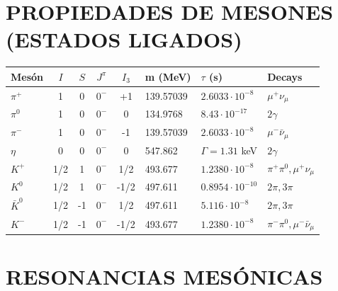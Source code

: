 

\section{PROPIEDADES DE MESONES (ESTADOS LIGADOS)}

{
\centering
\begin{tabular}{|l|c|c|c|c|l|l|l|}
\hline
\textbf{Mesón} & $I$ & $S$ & $J^\pi$ & $I_3$ & \textbf{m (MeV)} & $\tau$ \textbf{(s)} & \textbf{Decays} \\ \hline
$\pi^+$ & 1 & 0 & $0^-$ & +1 & 139.57039 & $2.6033 \cdot 10^{-8}$ & $\mu^+\nu_\mu$ \\ \hline
$\pi^0$ & 1 & 0 & $0^-$ & 0 & 134.9768 & $8.43 \cdot 10^{-17}$ & $2\gamma$ \\ \hline
$\pi^-$ & 1 & 0 & $0^-$ & -1 & 139.57039 & $2.6033 \cdot 10^{-8}$ & $\mu^-\bar{\nu}_\mu$ \\ \hline
$\eta$ & 0 & 0 & $0^-$ & 0 & 547.862 & $\Gamma = 1.31$ keV & $2\gamma$ \\ \hline
$K^+$ & 1/2 & 1 & $0^-$ & 1/2 & 493.677 & $1.2380 \cdot 10^{-8}$ & $\pi^+\pi^0, \mu^+\nu_\mu$ \\ \hline
$K^0$ & 1/2 & 1 & $0^-$ & -1/2 & 497.611 & $0.8954 \cdot 10^{-10} $ & $2\pi, 3\pi$ \\ \hline
$\bar{K}^0$ & 1/2 & -1 & $0^-$ & 1/2 & 497.611 & $5.116 \cdot 10^{-8}$ & $2\pi, 3\pi$ \\ \hline
$K^-$ & 1/2 & -1 & $0^-$ & -1/2 & 493.677& $1.2380\cdot 10^{-8}$ & $\pi^-\pi^0, \mu^-\bar{\nu}_\mu$ \\ \hline
\end{tabular}

}

\section{RESONANCIAS MESÓNICAS}

